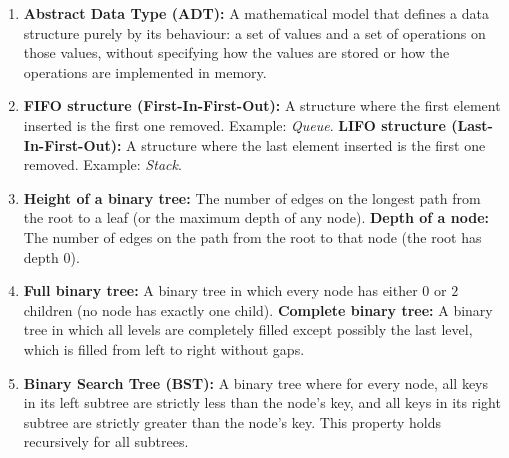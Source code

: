 \documentclass[11pt]{article}
\begin{document}
\begin{corrige}
\begin{enumerate}
\item \textbf{Abstract Data Type (ADT):} A mathematical model that defines a data structure purely by its behaviour: a set of values and a set of operations on those values, without specifying how the values are stored or how the operations are implemented in memory.
\item \textbf{FIFO structure (First-In-First-Out):} A structure where the first element inserted is the first one removed. Example: \emph{Queue}. \textbf{LIFO structure (Last-In-First-Out):} A structure where the last element inserted is the first one removed. Example: \emph{Stack}.
\item \textbf{Height of a binary tree:} The number of edges on the longest path from the root to a leaf (or the maximum depth of any node). \textbf{Depth of a node:} The number of edges on the path from the root to that node (the root has depth $0$).
\item \textbf{Full binary tree:} A binary tree in which every node has either $0$ or $2$ children (no node has exactly one child). \textbf{Complete binary tree:} A binary tree in which all levels are completely filled except possibly the last level, which is filled from left to right without gaps.
\item \textbf{Binary Search Tree (BST):} A binary tree where for every node, all keys in its left subtree are strictly less than the node's key, and all keys in its right subtree are strictly greater than the node's key. This property holds recursively for all subtrees.
\end{enumerate}
\end{corrige}
\end{document}
